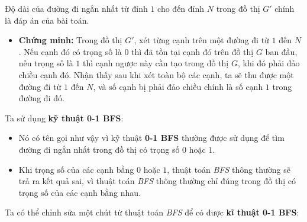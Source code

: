 \documentclass{article}
\begin{document}
Độ dài của đường đi ngắn nhất từ đỉnh $1$ cho đến đỉnh $N$ trong đồ thị $G'$ chính là đáp án của bài toán.

\begin{itemize}
    \item \textbf{Chứng minh:} Trong đồ thị $G'$, xét từng cạnh trên một đường đi từ $1$ đến $N$. Nếu cạnh đó có trọng số là $0$ thì đã tồn tại cạnh đó trên đồ thị $G$ ban đầu, nếu trọng số là $1$ thì cạnh ngược này cần tạo trong đồ thị $G$, khi đó phải đảo chiều cạnh đó. Nhận thấy sau khi xét toàn bộ các cạnh, ta sẽ thu được một đường đi từ $1$ đến $N$, và số cạnh bị phải đảo chiều chính là số cạnh $1$ trong đường đi đó.
\end{itemize}

Ta sử dụng \textbf{kỹ thuật 0-1 BFS}:

\begin{itemize}
    \item Nó có tên gọi như vậy vì kỹ thuật \textbf{0-1 BFS} thường được sử dụng để tìm đường đi ngắn nhất trong đồ thị có trọng số $0$ hoặc $1$.
    \item Khi trọng số của các cạnh bằng $0$ hoặc $1$, thuật toán \textit{BFS} thông thường sẽ trả ra kết quả sai, vì thuật toán \textit{BFS} thông thường chỉ đúng trong đồ thị có trọng số của các cạnh bằng nhau.
\end{itemize}
Ta có thể chỉnh sửa một chút từ thuật toán \textit{BFS} để có được \textbf{kĩ thuật 0-1 BFS}:
\end{document}
